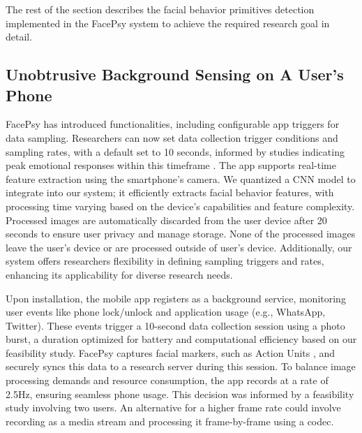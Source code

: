 The rest of the section describes the facial behavior primitives detection implemented in the FacePsy system to achieve the required research goal in detail. 

\subsection{Unobtrusive Background Sensing on A User's Phone}
\label{sec:UBS}
FacePsy has introduced functionalities, including configurable app triggers for data sampling. Researchers can now set data collection trigger conditions and sampling rates, with a default set to 10 seconds, informed by studies indicating peak emotional responses within this timeframe \cite{ekman2003emotions, matsumoto2011evidence}. The app supports real-time feature extraction using the smartphone's camera. We quantized a CNN model \cite{ertugrul2019cross} to integrate into our system; it efficiently extracts facial behavior features, with processing time varying based on the device's capabilities and feature complexity. Processed images are automatically discarded from the user device after 20 seconds to ensure user privacy and manage storage. None of the processed images leave the user's device or are processed outside of user's device. Additionally, our system offers researchers flexibility in defining sampling triggers and rates, enhancing its applicability for diverse research needs.

Upon installation, the mobile app registers as a background service, monitoring user events like phone lock/unlock and application usage (e.g., WhatsApp, Twitter). These events trigger a 10-second data collection session using a photo burst, a duration optimized for battery and computational efficiency based on our feasibility study. FacePsy captures facial markers, such as Action Units \cite{ekman1978facial}, and securely syncs this data to a research server during this session. To balance image processing demands and resource consumption, the app records at a rate of 2.5Hz, ensuring seamless phone usage. This decision was informed by a feasibility study involving two users. An alternative for a higher frame rate could involve recording as a media stream and processing it frame-by-frame using a codec.


